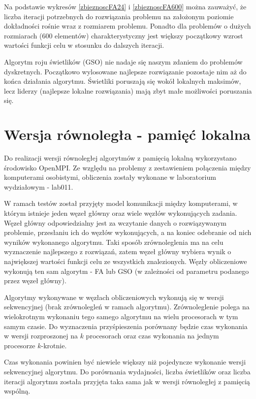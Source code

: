 \documentclass[11pt,a4paper,twoside]{article}
\begin{document}
Na podstawie wykresów \ref{zbieznoscFA24} i \ref{zbieznoscFA600} można zauważyć, że liczba iteracji potrzebnych do rozwiązania problemu na założonym poziomie dokładności rośnie wraz z rozmiarem problemu. Ponadto dla problemów o dużych rozmiarach (600 elementów) charakterystyczny jest większy początkowy wzrost wartości funkcji celu w stosunku do dalszych iteracji.

Algorytm roju świetlików (GSO) nie nadaje się naszym zdaniem do problemów dyskretnych. Początkowo wylosowane najlepsze rozwiązanie pozostaje nim aż do końca działania algorytmu. Świetliki poruszają się wokół lokalnych maksimów, lecz liderzy (najlepsze lokalne rozwiązania) mają zbyt małe możliwości poruszania się.

\section{Wersja równoległa - pamięć lokalna}
Do realizacji wersji równoległej algorytmów z pamięcią lokalną wykorzystano środowisko OpenMPI. Ze względu na problemy z zestawieniem połączenia między komputerami osobistymi, obliczenia zostały wykonane w laboratorium wydziałowym - lab011.

W ramach testów został przyjęty model komunikacji między komputerami, w którym istnieje jeden węzeł główny oraz wiele węzłów wykonujących zadania. Węzeł główny odpowiedzialny jest za wczytanie danych o rozwiązywanym problemie, przesłaniu ich do węzłów wykonujących, a na koniec odebranie od nich wyników wykonanego algorytmu. Taki sposób zrównoleglenia ma na celu wyznaczenie najlepszego z rozwiązań, zatem węzeł główny wybiera wynik o największej wartości funkcji celu ze wszystkich znalezionych. Węzły obliczeniowe wykonują ten sam algorytm - FA lub GSO (w zależności od parametru podanego przez węzeł główny).

Algorytmy wykonywane w węzłach obliczeniowych wykonują się w wersji sekwencyjnej (brak zrównolegleń w ramach algorytmu). Zrównoleglenie polega na wielokrotnym wykonaniu tego samego algorytmu na wielu procesorach w tym samym czasie. Do wyznaczenia przyśpieszenia porównany będzie czas wykonania w wersji rozproszonej na $k$ procesorach oraz czas wykonania na jednym procesorze $k$-krotnie.

Czas wykonania powinien być niewiele większy niż pojedyncze wykonanie wersji sekwencyjnej algorytmu. Do porównania wydajności, liczba świetlików oraz liczba iteracji algorytmu została przyjęta taka sama jak w wersji równoległej z pamięcią wspólną. 
\end{document}
